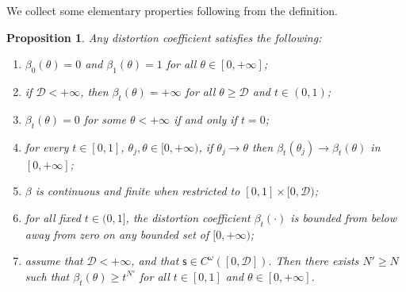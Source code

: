 \documentclass[11pt,a4paper]{article}
\theoremstyle{plain}
\newtheorem{proposition}[theorem]{Proposition}
\theoremstyle{definition}
\theoremstyle{remark}
\numberwithin{equation}{section}
\newcommand{\cD}{\mathcal{D}}
\newcommand{\sfs}{\mathsf{s}}
\begin{document}
We collect some elementary properties following from the definition.
\begin{proposition}\label{prop:propertiesbeta}
Any distortion coefficient satisfies the following:
\begin{enumerate}[label=(\roman*)]
\item \label{i:propertiesbeta-1}  $\beta_0(\theta)=0$ and $\beta_1(\theta) = 1$ for all $\theta \in [0,+\infty]$;
\item \label{i:propertiesbeta0}  if $\cD<+\infty$, then $\beta_t(\theta) = +\infty$ for all $\theta \geq \cD$ and $t\in (0,1)$;
\item \label{i:propertiesbeta1} $\beta_{t}(\theta)=0$ for some $\theta < +\infty$ if and only if $t=0$;
\item \label{i:propertiesbeta2} for every $t\in [0,1]$,  $\theta_{j}, \theta\in  [0,+\infty)$, if $\theta_{j}\to \theta$ then $\beta_{t}(\theta_{j})\to \beta_{t}(\theta)$ in $[0,+\infty]$;
\item \label{i:propertiesbeta3} $\beta$ is  continuous and finite when restricted to $[0,1]\times [0,\cD)$;
\item \label{i:propertiesbeta4} for all fixed $t\in (0,1]$, the distortion coefficient $\beta_t(\cdot)$ is  bounded from below away from zero on any bounded set of $[0,+\infty)$; 
\item \label{i:propertiesbeta5} assume that $\cD<+\infty$, and that $\sfs \in C^\omega([0,\cD])$. Then there exists $N'\geq N$ such that $\beta_t(\theta) \geq t^{N'}$ for all $t\in [0,1]$ and $\theta \in[0,+\infty]$.
\end{enumerate}
\end{proposition}
\end{document}
